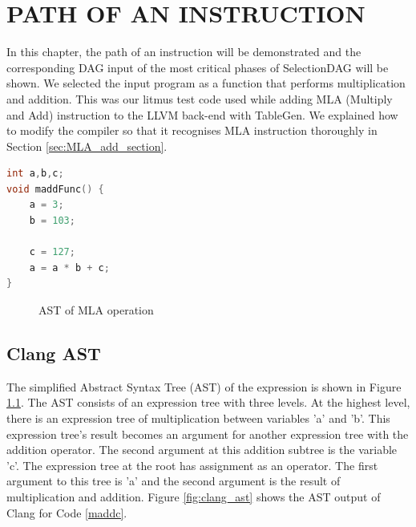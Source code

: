 
\clearpage
\chapter{PATH OF AN INSTRUCTION}\label{Ch4}
In this chapter, the path of an instruction will be demonstrated and the corresponding DAG input of the most critical phases of SelectionDAG will be shown. We selected the input program as a function that performs multiplication and addition. This was our litmus test code used while adding MLA (Multiply and Add) instruction to the LLVM back-end with TableGen. We explained how to modify the compiler so that it recognises MLA instruction thoroughly in Section \ref{sec:MLA_add_section}. 

\begin{lstlisting}[language=C, caption=madd.c program, label=maddc]
int a,b,c;
void maddFunc() {
	a = 3;
	b = 103;
	
	c = 127;
	a = a * b + c;
}
\end{lstlisting}

\begin{figure}
    \centering
{}
    \caption{AST of MLA operation}
    \label{fig:ast_mla}
\end{figure}

\section{Clang AST}
The simplified Abstract Syntax Tree (AST) of the expression is shown in Figure \ref{fig:ast_mla}. The AST consists of an expression tree with three levels. At the highest level, there is an expression tree of multiplication between variables 'a' and 'b'. This expression tree's result becomes an argument for another expression tree with the addition operator. The second argument at this addition subtree is the variable 'c'. The expression tree at the root has assignment as an operator. The first argument to this tree is 'a' and the second argument is the result of multiplication and addition. Figure \ref{fig:clang_ast} shows the AST output of Clang for Code \ref{maddc}. 

